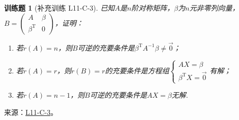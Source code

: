 \documentclass[12pt,fontset=fandol]{ctexart}
\newtheorem{exercise}{训练题}[section]
\begin{document}
\begin{exercise}[补充训练 L11-C-3]\label{prob:L11-C-3}
已知$A$是$n$阶对称矩阵，$\beta$为$n$元非零列向量，$B=\begin{pmatrix}
                A & \beta \\ \beta^\mathrm{T} & 0
            \end{pmatrix}$，证明：
        \begin{enumerate}
            \item 若$r(A)=n$，则$B$可逆的充要条件是$\beta^\mathrm{T}A^{-1}\beta \neq \vec{0}$；

            \item 若$r(A)=r$，则$r(B)=r$的充要条件是方程组$\begin{cases}
                          AX=\beta \\ \beta^\mathrm{T}X=\vec{0}
                      \end{cases}$有解；

            \item 若$r(A)=n-1$，则$B$可逆的充要条件是$AX=\beta$无解.
        \end{enumerate}
\end{exercise}
\noindent 来源：\href{https://github.com/yhwu-is/Linear-Algebra-Left-Undone/blob/new/%E8%AE%B2%E4%B9%89/%E4%B8%93%E9%A2%98/11%20%E6%9C%9D%E8%8A%B1%E5%A4%95%E6%8B%BE.tex}{L11-C-3}。
\end{document}
